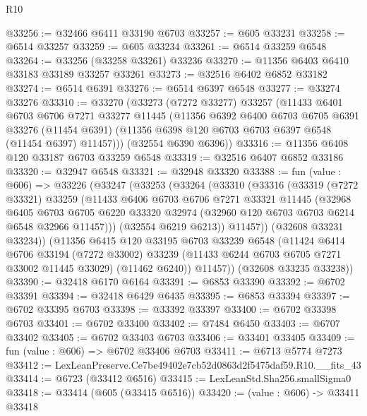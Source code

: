\begin{lexlean}{R10}
\begin{coremodule}
@33256 := @32466 @6411 @33190 @6703
@33257 := @605 @33231
@33258 := @6514 @33257
@33259 := @605 @33234
@33261 := @6514 @33259 @6548
@33264 := @33256 (@33258 @33261) @33236
@33270 := @11356 @6403 @6410 @33183 @33189 @33257 @33261
@33273 := @32516 @6402 @6852 @33182
@33274 := @6514 @6391
@33276 := @6514 @6397 @6548
@33277 := @33274 @33276
@33310 := @33270
    (@33273
      (@7272 @33277)
      @33257
      (@11433
        @6401
        @6703
        @6706
        @7271
        @33277
        @11445
        (@11356
          @6392
          @6400
          @6703
          @6705
          @6391
          @33276
          (@11454 @6391)
          (@11356 @6398 @120 @6703 @6703 @6397 @6548 (@11454 @6397) @11457)))
      (@32554 @6390 @6396))
@33316 := @11356 @6408 @120 @33187 @6703 @33259 @6548
@33319 := @32516 @6407 @6852 @33186
@33320 := @32947 @6548
@33321 := @32948 @33320
@33388 := fun (value : @606) =>
  @33226
    (@33247
      (@33253
        (@33264
          (@33310
            (@33316
              (@33319
                (@7272 @33321)
                @33259
                (@11433
                  @6406
                  @6703
                  @6706
                  @7271
                  @33321
                  @11445
                  (@32968
                    @6405
                    @6703
                    @6705
                    @6220
                    @33320
                    @32974
                    (@32960 @120 @6703 @6703 @6214 @6548 @32966 @11457)))
                (@32554 @6219 @6213))
              @11457))
          (@32608 @33231 @33234))
        (@11356
          @6415
          @120
          @33195
          @6703
          @33239
          @6548
          (@11424
            @6414
            @6706
            @33194
            (@7272 @33002)
            @33239
            (@11433 @6244 @6703 @6705 @7271 @33002 @11445 @33029)
            (@11462 @6240))
          @11457))
      (@32608 @33235 @33238))
@33390 := @32418 @6170 @6164
@33391 := @6853 @33390
@33392 := @6702 @33391
@33394 := @32418 @6429 @6435
@33395 := @6853 @33394
@33397 := @6702 @33395 @6703
@33398 := @33392 @33397
@33400 := @6702 @33398 @6703
@33401 := @6702 @33400
@33402 := @7484 @6450
@33403 := @6707 @33402
@33405 := @6702 @33403 @6703
@33406 := @33401 @33405
@33409 := fun (value : @606) => @6702 @33406 @6703
@33411 := @6713 @5774 @7273
@33412 := LexLeanPreserve.Ce7be49402e7cb52d0863d2f5475daf59.R10.__fits_43
@33414 := @6723 (@33412 @6516)
@33415 := LexLeanStd.Sha256.smallSigma0
@33418 := @33414 (@605 (@33415 @6516))
@33420 := (value : @606) -> @33411 @33418

\end{coremodule}
\end{lexlean}
